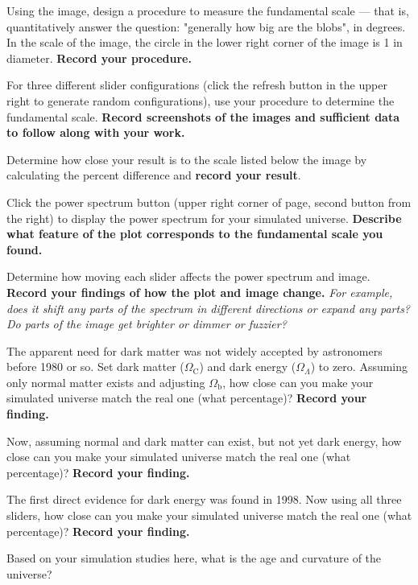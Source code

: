 \begin{steps}

	\item Using the image, design a procedure to measure the fundamental scale --- that is, quantitatively answer the question: "generally how big are the blobs", in degrees. In the scale of the image, the circle in the lower right corner of the image is 1\textdegree{} in diameter. \textbf{Record your procedure.}

	\item For three different slider configurations (click the refresh button in the upper right to generate random configurations), use your procedure to determine the fundamental scale. \textbf{Record screenshots of the images and sufficient data to follow along with your work.} 
	
	\item Determine how close your result is to the scale listed below the image by calculating the percent difference and \textbf{record your result}.

	\item Click the power spectrum button (upper right corner of page, second button from the right) to display the power spectrum for your simulated universe. \textbf{Describe what feature of the plot corresponds to the fundamental scale you found.}

	\item Determine how moving each slider affects the power spectrum and image. \textbf{Record your findings of how the plot and image change.} \textit{For example, does it shift any parts of the spectrum in different directions or expand any parts? Do parts of the image get brighter or dimmer or fuzzier?}

	\item The apparent need for dark matter was not widely accepted by astronomers before 1980 or so. Set dark matter ($\Omega_\textrm{C}$) and dark energy ($\Omega_\Lambda$) to zero. Assuming only normal matter exists and adjusting $\Omega_\textrm{b}$, how close can you make your simulated universe match the real one (what percentage)? \textbf{Record your finding.}

	\item Now, assuming normal and dark matter can exist, but not yet dark energy, how close can you make your simulated universe match the real one (what percentage)? \textbf{Record your finding.}
	
	\item The first direct evidence for dark energy was found in 1998. Now using all three sliders, how close can you make your simulated universe match the real one (what percentage)? \textbf{Record your finding.}

	\item Based on your simulation studies here, what is the age and curvature of the universe?

\end{steps}

